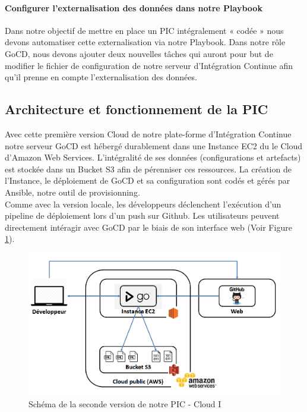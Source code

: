           \paragraph{Configurer l'externalisation des données dans notre Playbook} Dans notre objectif de mettre en place un PIC intégralement « codée » nous devons automatiser cette externalisation via notre Playbook. Dans notre rôle GoCD, nous devons ajouter deux nouvelles tâches qui auront pour but de modifier le fichier de configuration de notre serveur d'Intégration Continue afin qu'il prenne en compte l'externalisation des données.

        \subsection{Architecture et fonctionnement de la PIC}
        Avec cette première version Cloud de notre plate-forme d'Intégration Continue notre serveur GoCD est hébergé durablement dans une Instance EC2 du le Cloud d'Amazon Web Services. L'intégralité de ses données (configurations et artefacts) est stockée dans un Bucket S3 afin de pérenniser ces ressources. La création de l'Instance, le déploiement de GoCD et sa configuration sont codés et gérés par Ansible, notre outil de provisionning.\\

        Comme avec la version locale, les développeurs déclenchent l'exécution d'un pipeline de déploiement lors d'un push sur Github. Les utilisateurs peuvent directement intéragir avec GoCD par le biais de son interface web (Voir Figure \ref{PICv2}).\\

        \begin{figure}
          \begin{center}
            \includegraphics[scale=0.5]{images/PICv2.png}
          \end{center}
          \caption{Schéma de la seconde version de notre PIC - Cloud I}
          \label{PICv2}
        \end{figure}

